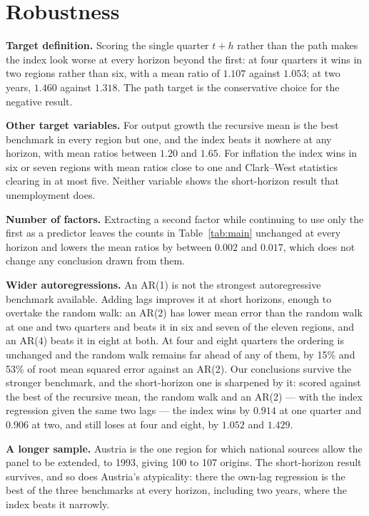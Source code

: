 \documentclass[12pt]{article}
\begin{document}
\section{Robustness}
\label{sec:robust}

\textbf{Target definition.} Scoring the single quarter $t+h$ rather than the
path makes the index look worse at every horizon beyond the first: at four
quarters it wins in two regions rather than six, with a mean ratio of $1.107$
against $1.053$; at two years, $1.460$ against $1.318$. The path target is the
conservative choice for the negative result.

\textbf{Other target variables.} For output growth the recursive mean is the
best benchmark in every region but one, and the index beats it nowhere at any
horizon, with mean ratios between $1.20$ and $1.65$. For inflation the index
wins in six or seven regions with mean ratios close to one and Clark--West
statistics clearing in at most five. Neither variable shows the short-horizon
result that unemployment does.

\textbf{Number of factors.} Extracting a second factor while continuing to use
only the first as a predictor leaves the counts in Table~\ref{tab:main}
unchanged at every horizon and lowers the mean ratios by between $0.002$ and
$0.017$, which does not change any conclusion drawn from them.

\textbf{Wider autoregressions.} An AR(1) is not the strongest autoregressive
benchmark available. Adding lags improves it at short horizons, enough to
overtake the random walk: an AR(2) has lower mean error than the random walk at
one and two quarters and beats it in six and seven of the eleven regions, and
an AR(4) beats it in eight at both. At four and eight quarters the ordering is
unchanged and the random walk remains far ahead of any of them, by 15\% and
53\% of root mean squared error against an AR(2). Our conclusions survive the
stronger benchmark, and the short-horizon one is sharpened by it: scored
against the best of the recursive mean, the random walk and an AR(2) --- with
the index regression given the same two lags --- the index wins by $0.914$ at
one quarter and $0.906$ at two, and still loses at four and eight, by $1.052$
and $1.429$.

\textbf{A longer sample.} Austria is the one region for which national sources
allow the panel to be extended, to 1993, giving 100 to 107 origins. The
short-horizon result survives, and so does Austria's atypicality: there the
own-lag regression is the best of the three benchmarks at every horizon,
including two years, where the index beats it narrowly.
\end{document}
